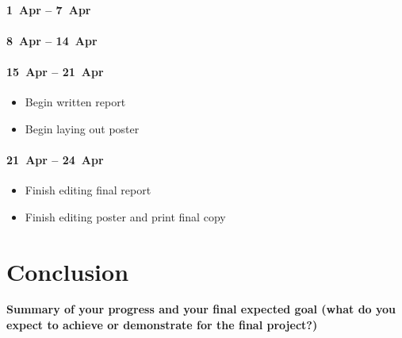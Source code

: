 \documentclass[11pt]{article}
\newcommand{\xxx}[1]{{\bf \color{red} #1}}
\newcommand{\meh}[1]{{\bf \color{blue} #1}}
\begin{document}
\paragraph{1~Apr -- 7~Apr}

\paragraph{8~Apr -- 14~Apr}

\paragraph{15~Apr -- 21~Apr}
\meh{
\begin{itemize}
    \item Begin written report
    \item Begin laying out poster
\end{itemize}

\paragraph{21~Apr -- 24~Apr}
\begin{itemize}
    \item Finish editing final report
    \item Finish editing poster and print final copy
\end{itemize}
}

\section{Conclusion}
\xxx{Summary of your progress and your final expected goal (what do you expect
    to achieve or demonstrate for the final project?)}



\end{document}
